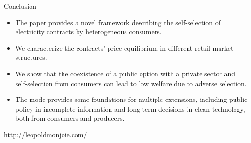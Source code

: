 \documentclass{class}
\begin{document}
\begin{frame}{Conclusion}

\begin{itemize}
    \item The paper provides a novel framework describing the self-selection of electricity contracts by heterogeneous consumers.\vfill
    \item We characterize the contracts' price equilibrium in different retail market structures.\vfill
    \item We show that the coexistence of a public option with a private sector and self-selection from consumers can lead to low welfare due to adverse selection.\vfill
    \item The mode provides some foundations for multiple extensions, including public policy in incomplete information and long-term decisions in clean technology, both from consumers and producers.
\end{itemize}
    
\end{frame}





\begin{frame}{}
  
  \vspace{1cm}

  http://leopoldmonjoie.com/
\end{frame}


\setcounter{totalbeforeappendix}{\value{framenumber}}
\addtocounter{totalbeforeappendix}{2} 
\addtocounter{framenumber}{-26}
\end{document}
